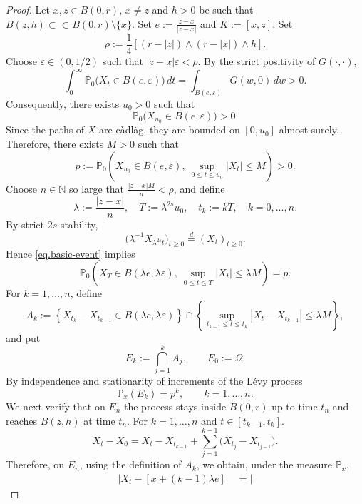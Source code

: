 \documentclass[10pt,a4paper]{amsart}
\begin{document}
\begin{proof}
Let $x,z\in B(0,r)$, $x\neq z$ and $h>0$ be such that  $B(z,h)\subset\subset B(0,r)\setminus \{x\}$. Set 
$e:=\frac{z-x}{|z-x|}$ and  $K:=[x,z]$.
Set
\[
\rho:=\frac14[(r-|z|)\wedge (r-|x|)\wedge h].
\]
Choose $\varepsilon \in (0,1/2)$ such that $|z-x|\varepsilon<\rho$.
By the strict positivity of $G(\cdot,\cdot)$,
\[
\int_0^\infty
\mathbb{P}_0\bigl(X_t\in B(e,\varepsilon)\bigr)\,dt
=
\int_{B(e,\varepsilon)}G(w,0)\,dw>0.
\]
Consequently, there exists $u_0>0$ such that
\begin{equation}
\label{eq.endpoint-positive}
\mathbb{P}_0\bigl(X_{u_0}\in B(e,\varepsilon)\bigr)>0.
\end{equation}
Since the paths of $X$ are c\`adl\`ag, they are bounded on
$[0,u_0]$ almost surely. Therefore,
there exists $M>0$ such
that
\begin{equation}
\label{eq.basic-event}
p:=
\mathbb{P}_0\left(
X_{u_0}\in B(e,\varepsilon),\
\sup_{0\leq t\leq u_0}|X_t|\leq M
\right)>0.
\end{equation}
Choose $n\in\mathbb{N}$ so large that $\frac{|z-x|M}{n}<\rho$,
and define
\[
\lambda:=\frac{|z-x|}{n},\quad
T:=\lambda^{2s} u_0,
\quad
t_k:=kT,
\quad k=0,\ldots,n.
\]
By strict $2s$-stability,
\[
\bigl(\lambda^{-1}X_{\lambda^{2s} t}\bigr)_{t\geq0}
\overset{d}{=}
(X_t)_{t\geq0}.
\]
Hence \eqref{eq.basic-event} implies
\begin{equation}
\label{eq.scaled-event}
\mathbb{P}_0\left(
X_{T}\in B(\lambda e,\lambda\varepsilon),\
\sup_{0\leq t\leq T}|X_t|\leq\lambda M
\right)=p.
\end{equation}
For $k=1,\ldots,n$, define
\[
A_k:=
\left\{
X_{t_k}-X_{t_{k-1}}
   \in B(\lambda e,\lambda\varepsilon)
\right\}
\cap
\left\{
\sup_{t_{k-1}\leq t\leq t_k}
|X_t-X_{t_{k-1}}|
\leq\lambda M
\right\},
\]
and put
\[
E_k:=\bigcap_{j=1}^{k}A_j,
\qquad E_0:=\Omega.
\]
By independence and stationarity of increments of the L\'evy process
\begin{equation}
\label{eq.iterated-probability}
\mathbb{P}_x(E_k)=p^k,
\qquad k=1,\ldots,n.
\end{equation}
We next verify that on $E_n$ the process stays inside $B(0,r)$ up to
time $t_n$ and reaches $B(z,h)$ at time $t_n$. For $k=1,\ldots,n$ and  $t\in[t_{k-1},t_{k}]$.
\[
X_{t}-X_0
=
X_t-X_{t_{k-1}}+\sum_{j=1}^{k-1}
\bigl(X_{t_j}-X_{t_{j-1}}\bigr).
\]
Therefore,  on $E_n$, using the definition of $A_k$, we obtain, under the measure $\mathbb P_x$,
\[
\begin{split}
\left|
X_t-[x+(k-1)\lambda e]
\right|&=\left|

\end{split}\]
\end{proof}
\end{document}
